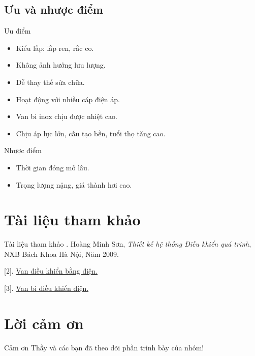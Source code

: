 \documentclass[20pt]{beamer}
\begin{document}
\subsection*{Ưu và nhược điểm}
\begin{frame}{Ưu điểm}
\begin{itemize}
\justifying
	\item Kiểu lắp: lắp ren, rắc co.
	\item Không ảnh hưởng lưu lượng.
	\item Dễ thay thế sửa chữa.
	\item Hoạt động với nhiều cáp điện áp.
	\item Van bi inox chịu được nhiệt cao.
	\item Chịu áp lực lớn, cấu tạo bền, tuổi thọ tăng cao.
\end{itemize}
\end{frame}

\begin{frame}{Nhược điểm}
\begin{itemize}
\justifying
	\item Thời gian đóng mở lâu.
	\item Trọng lượng nặng, giá thành hơi cao.
\end{itemize}
\end{frame}
\section*{Tài liệu tham khảo}
\begin{frame}{Tài liệu tham khảo}
\justifying
[1]. Hoàng Minh Sơn, \textit{Thiết kế hệ thống Điều khiển quá trình}, NXB Bách Khoa Hà Nội, Năm 2009.

[2]. \href{http://vankhinen.vn/van-dieu-khien-dien-d12.html}{Van điều khiển bằng điện.}

[3]. \href{http://vankhinen.vn/van-bi-dieu-khien-dien-id49.html}{Van bi điều khiển điện.}
\end{frame}
\section*{Lời cảm ơn}
\begin{frame}
\justifying
\Large \alert{Cảm ơn Thầy và các bạn đã theo dõi phần trình bày của nhóm!}
\end{frame}
\end{document}
